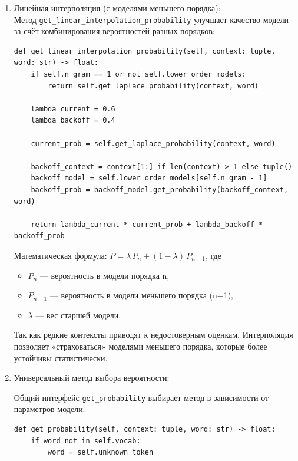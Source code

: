 \documentclass[coursework]{SCWorks}
\begin{document}
\begin{enumerate}
        Принцип метода: \\
        Сглаживание Лапласа добавляет единицу к частоте каждого слова:
        $P(w_t \mid context) = \frac{C(context, w_t) + \alpha}{C(context) + \alpha \cdot |V|}$
        где
        \begin{itemize}
            \item \alpha = 1 (по умолчанию),
            \item |V| — размер словаря.
        \end{itemize}
        \item Линейная интерполяция (с моделями меньшего порядка): \\
        Метод \texttt{get\_linear\_interpolation\_probability} улучшает качество модели за счёт комбинирования вероятностей разных порядков:
        \begin{verbatim}
def get_linear_interpolation_probability(self, context: tuple, word: str) -> float:
    if self.n_gram == 1 or not self.lower_order_models:
        return self.get_laplace_probability(context, word)

    lambda_current = 0.6
    lambda_backoff = 0.4

    current_prob = self.get_laplace_probability(context, word)

    backoff_context = context[1:] if len(context) > 1 else tuple()
    backoff_model = self.lower_order_models[self.n_gram - 1]
    backoff_prob = backoff_model.get_probability(backoff_context, word)

    return lambda_current * current_prob + lambda_backoff * backoff_prob
        \end{verbatim}

        Математическая формула: $P = \lambda \, P_n + (1 - \lambda) \, P_{n-1}$, где
        \begin{itemize}
            \item $P_n$ — вероятность в модели порядка n,
            \item $P_{n-1}$ — вероятность в модели меньшего порядка (n−1),
            \item $\lambda$ — вес старшей модели.
        \end{itemize}
        Так как редкие контексты приводят к недостоверным оценкам.
        Интерполяция позволяет «страховаться» моделями меньшего порядка, которые более устойчивы статистически.
        \item Универсальный метод выбора вероятности:

        Общий интерфейс \texttt{get\_probability} выбирает метод в зависимости от параметров модели:
        \begin{verbatim}
def get_probability(self, context: tuple, word: str) -> float:
    if word not in self.vocab:
        word = self.unknown_token


\end{verbatim}
\end{enumerate}
\end{document}
